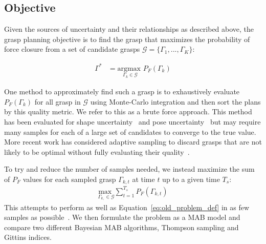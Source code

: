 \documentclass[10pt, conference]{ieeeconf}      %
\newcommand{\mG}{\mathcal{G}}
\begin{document}
\subsection{Objective}

Given the sources of uncertainty and their relationships as described above, the grasp planning objective is to find the grasp that maximizes the probability of force closure from a set of candidate grasps $\mG = \{\Gamma_1, ..., \Gamma_K\}$:

\vspace{-2ex}
\begin{align}
\Gamma^* &= \underset{\Gamma_k \in \mG}{\text{argmax }} P_F\left( \Gamma_k\right) \label{eq:old_problem_def}
\end{align}



One method to approximately find such a grasp is to exhaustively evaluate $P_F(\Gamma_k)$ for all grasp in $\mG$ using Monte-Carlo integration and then sort the plans by this quality metric.
We refer to this as a brute force approach. 
This method has been evaluated for shape uncertainty~\cite{christopoulos2007handling, kehoe2012estimating} and pose uncertainty~\cite{weisz2012pose} but may require many samples for each of a large set of candidates to converge to the true value.
More recent work has considered adaptive sampling to discard grasps that are not likely to be optimal without fully evaluating their quality~\cite{kehoe2012toward}.

To try and reduce the number of samples needed, we instead maximize the sum of $P_F$ values for each sampled grasp  $\Gamma_{k,t}$ at time $t$ up to a given time $T_s$:
\begin{align}
    \underset{\Gamma_{k,} \in \mG}{\text{max }} \sum \limits_{t=1}^
    {T_s} P_F \left( \Gamma_{k,t}\right)  \label{eq:problem_def}
\end{align}
\noindent This attempts to perform as well as Equation~\ref{eq:old_problem_def} in as few samples as possible~\cite{srinivas2009gaussian}. We then formulate the  problem as a MAB model and compare two different Bayesian MAB algorithms, Thompson sampling and Gittins indices.
\end{document}
